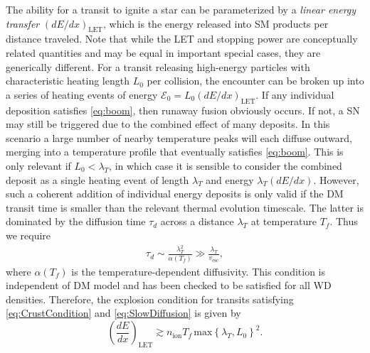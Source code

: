 \documentclass[twocolumn,showpacs,preprintnumbers,amsmath,amssymb,prd]{revtex4}
\begin{document}
The ability for a transit to ignite a star can be parameterized by a \emph{linear energy transfer} $(dE/dx)_\text{LET}$, which is the energy released into SM products per distance traveled.
Note that while the LET and stopping power are conceptually related quantities and may be equal in important special cases, they are generically different.
For a transit releasing high-energy particles with characteristic heating length $L_0$ per collision, the encounter can be broken up into a series of heating events of energy $\mathcal{E}_0 = L_0 (d E/d x)_\text{LET}$.
If any individual deposition satisfies \eqref{eq:boom}, then runaway fusion obviously occurs.
If not, a SN may still be triggered due to the combined effect of many deposits.
In this scenario a large number of nearby temperature peaks will each diffuse outward, merging into a temperature profile that eventually satisfies \eqref{eq:boom}.
This is only relevant if $L_0 < \lambda_T$, in which case it is sensible to consider the combined deposit as a single heating event of length $\lambda_T$ and energy $\lambda_T (d E/d x)$.
However, such a coherent addition of individual energy deposits is only valid if the DM transit time is smaller than the relevant thermal evolution timescale.
The latter is dominated by the diffusion time $\tau_d$ across a distance $\lambda_T$ at temperature $T_f$.
Thus we require
\begin{align}
\tau_d \sim \frac{\lambda_T^2}{\alpha(T_f)} \gg \frac{\lambda_T}{v_\text{esc}},
\label{eq:SlowDiffusion}
\end{align}
where $\alpha(T_f)$ is the temperature-dependent diffusivity.
This condition is independent of DM model and has been checked to be satisfied for all WD densities.
Therefore, the explosion condition for transits satisfying \eqref{eq:CrustCondition} and \eqref{eq:SlowDiffusion} is given by
\begin{equation}
\label{eq:transitexplosion}
  \left( \frac{d E}{d x} \right)_\text{LET} \gtrsim n_\text{ion} T_f\, \text{max}\left\{\lambda_T, L_0 \right\}^2.
\end{equation}
\end{document}
